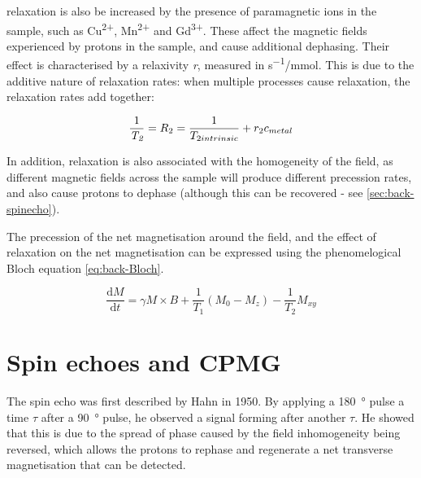 \Ttwo relaxation is also be increased by the presence of paramagnetic ions in the sample, such as Cu\textsuperscript{2+}, Mn\textsuperscript{2+} and Gd\textsuperscript{3+}.
These affect the magnetic fields experienced by protons in the sample, and cause additional dephasing.
Their effect is characterised by a relaxivity \textit{r}, measured in \si{s^{-1}/mmol}.
This is due to the additive nature of relaxation rates: when multiple processes cause relaxation, the relaxation rates add together:

\begin{displaymath}
\frac{1}{\textit{T\textsubscript{2}}} = R_2 = \frac{1}{T_{2 intrinsic}} + r_{2} c_{metal}
\end{displaymath}

In addition, \Ttwo relaxation is also associated with the homogeneity of the \Bzero field, as different magnetic fields across the sample will produce different precession rates, and also cause protons to dephase (although this can be recovered - see \autoref{sec:back-spinecho}).

The precession of the net magnetisation around the \Bzero field, and the effect of relaxation on the net magnetisation can be expressed using the phenomelogical Bloch equation \autoref{eq:back-Bloch}.

\begin{equation}
\frac{\mathrm{d}M}{\mathrm{d}t} = \gamma M \times B + \frac{1}{T_1} (M_0 - M_z) - \frac{1}{T_2} M_{xy}
\label{eq:back-Bloch}
\end{equation}

\section{Spin echoes and CPMG}
\label{sec:back-spinecho}
The spin echo was first described by Hahn in 1950\cite{HahnSpinEchoes1950}.
By applying a \SI{180}{\degree} pulse a time $\tau$ after a \SI{90}{\degree} pulse, he observed a signal forming after another $\tau$.
He showed that this is due to the spread of phase caused by the \Bzero field inhomogeneity being reversed, which allows the protons to rephase and regenerate a net transverse magnetisation that can be detected.

